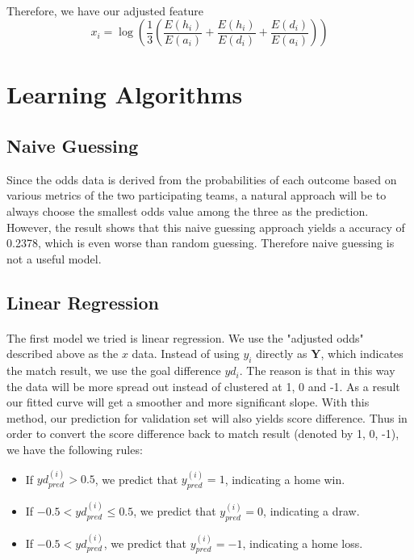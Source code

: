 \documentclass[12pt]{article}
\begin{document}
\paragraph{}
Therefore, we have our adjusted feature \[
x_i = \log(\frac{1}{3}(\frac{E(h_i)}{E(a_i)} + \frac{E(h_i)}{E(d_i)} + \frac{E(d_i)}{E(a_i)}))
\]
\section{Learning Algorithms}
\subsection{Naive Guessing}
Since the odds data is derived from the probabilities of each outcome based on various metrics of the two participating teams, a natural approach will be to always choose the smallest odds value among the three as the prediction. However, the result shows that this naive guessing approach yields a accuracy of 0.2378, which is even worse than random guessing. Therefore naive guessing is not a useful model.

\subsection{Linear Regression}

\paragraph{}
The first model we tried is linear regression. We use the "adjusted odds" described above as the $x$ data. Instead of using $y_i$ directly as $\mathbf{Y}$, which indicates the match result, we use the goal difference $yd_i$. The reason is that in this way the data will be more spread out instead of clustered at 1, 0 and -1. As a result our fitted curve will get a smoother and more significant slope. With this method, our prediction for validation set will also yields score difference. Thus in order to convert the score difference back to match result (denoted by 1, 0, -1), we have the following rules:
\begin{itemize}
 \item If $yd_{pred}^{(i)} > 0.5$, we predict that $y_{pred}^{(i)} = 1$, indicating a home win.
 \item If $-0.5 < yd_{pred}^{(i)} \leq 0.5$, we predict that $y_{pred}^{(i)} = 0$, indicating a draw.
 \item If $-0.5 < yd_{pred}^{(i)}$, we predict that $y_{pred}^{(i)} = -1$, indicating a home loss.
\end{itemize}
\end{document}
